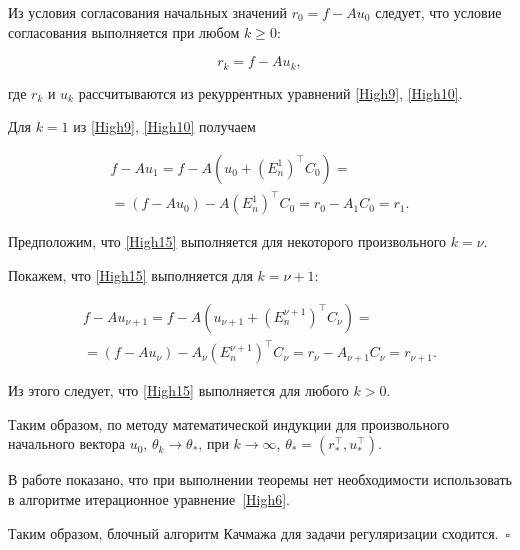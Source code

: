Из условия согласования начальных значений $r_{0}=f-Au_{0}$ следует, что условие согласования выполняется при любом $k\geq 0$:

\begin{equation}

r_{k}=f-Au_{k},

\label{High15}

\end{equation}

где $r_{k}$ и $u_{k}$ рассчитываются из рекуррентных уравнений \eqref{High9}, \eqref{High10}.



Для $k=1$ из \eqref{High9}, \eqref{High10} получаем

\begin{multline*}

f-Au_{1}=f-A(u_{0}+(E^{1}_{n})^{\top}C_{0}) = \\ =(f-Au_{0})-A(E^{1}_{n})^{\top}C_{0}=r_{0}-A_{1}C_{0}=r_{1}.

\end{multline*}



Предположим, что \eqref{High15} выполняется для некоторого произвольного $k=\nu$.

Покажем, что \eqref{High15} выполняется для $k=\nu+1$:

\begin{multline*}

f-Au_{\nu+1}=f-A(u_{\nu+1}+(E^{\nu+1}_{n})^{\top}C_{\nu})= \\ =(f-Au_{\nu})-A_{\nu}(E^{\nu+1}_{n})^{\top}C_{\nu}=r_{\nu}-A_{\nu+1}C_{\nu}=r_{\nu+1}.

\end{multline*}

Из этого следует, что \eqref{High15} выполняется для любого $k>0$.



Таким образом, по методу математической индукции для произвольного начального вектора $u_{0}$, $\theta _{k} \rightarrow \theta _{\ast}$, при $k \rightarrow \infty$, $\theta _{\ast}=(r^{\top}_{\ast},u^{\top}_{\ast})$.



В работе \cite{Zhdanov}  показано, что при выполнении теоремы нет необходимости использовать в алгоритме итерационное уравнение~\eqref{High6}. 

Таким образом, блочный алгоритм Качмажа для задачи регуляризации сходится.~$\square$



